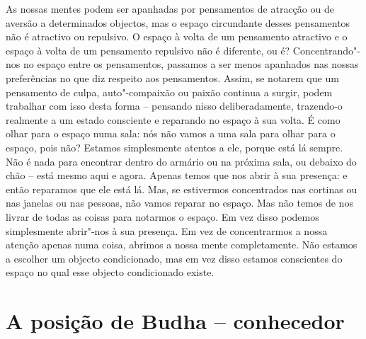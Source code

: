 As nossas mentes podem ser apanhadas por pensamentos de atracção ou de
aversão a determinados objectos, mas o espaço circundante desses
pensamentos não é atractivo ou repulsivo. O espaço à volta de um
pensamento atractivo e o espaço à volta de um pensamento repulsivo não é
diferente, ou é? Concentrando"-nos no espaço entre os pensamentos,
passamos a ser menos apanhados nas nossas preferências no que diz
respeito aos pensamentos. Assim, se notarem que um pensamento de culpa,
auto"-compaixão ou paixão continua a surgir, podem trabalhar com isso
desta forma -- pensando nisso deliberadamente, trazendo-o realmente a um
estado consciente e reparando no espaço à sua volta. É como olhar para o
espaço numa sala: nós não vamos a uma sala para olhar para o espaço,
pois não? Estamos simplesmente atentos a ele, porque está lá sempre. Não
é nada para encontrar dentro do armário ou na próxima sala, ou debaixo
do chão -- está mesmo aqui e agora. Apenas temos que nos abrir à sua
presença: e então reparamos que ele está lá. Mas, se estivermos
concentrados nas cortinas ou nas janelas ou nas pessoas, não vamos
reparar no espaço. Mas não temos de nos livrar de todas as coisas para
notarmos o espaço. Em vez disso podemos simplesmente abrir"-nos à sua
presença. Em vez de concentrarmos a nossa atenção apenas numa coisa,
abrimos a nossa mente completamente. Não estamos a escolher um objecto
condicionado, mas em vez disso estamos conscientes do espaço no qual
esse objecto condicionado existe.

\section{A posição de Budha -- conhecedor}


